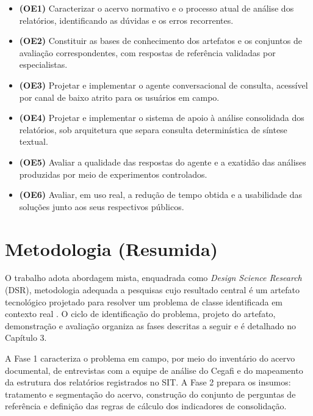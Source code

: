 \begin{itemize}
	\item \textbf{(OE1)} Caracterizar o acervo normativo e o processo atual de
	análise dos relatórios, identificando as dúvidas e os erros recorrentes.

	\item \textbf{(OE2)} Constituir as bases de conhecimento dos artefatos e os
	conjuntos de avaliação correspondentes, com respostas de referência validadas
	por especialistas.

	\item \textbf{(OE3)} Projetar e implementar o agente conversacional de
	consulta, acessível por canal de baixo atrito para os usuários em campo.

	\item \textbf{(OE4)} Projetar e implementar o sistema de apoio à análise
	consolidada dos relatórios, sob arquitetura que separa consulta determinística
	de síntese textual.

	\item \textbf{(OE5)} Avaliar a qualidade das respostas do agente e a exatidão
	das análises produzidas por meio de experimentos controlados.

	\item \textbf{(OE6)} Avaliar, em uso real, a redução de tempo obtida e a
	usabilidade das soluções junto aos seus respectivos públicos.
\end{itemize}

\section{Metodologia (Resumida)}
\label{sec:introducao-metodologia}

O trabalho adota abordagem mista, enquadrada como \textit{Design Science
Research} (DSR), metodologia adequada a pesquisas cujo resultado central é um
artefato tecnológico projetado para resolver um problema de classe identificada
em contexto real \cite{hevner2004,wieringa2014}. O ciclo de identificação do
problema, projeto do artefato, demonstração e avaliação organiza as fases
descritas a seguir e é detalhado no Capítulo 3.

A Fase 1 caracteriza o problema em campo, por meio do inventário do acervo
documental, de entrevistas com a equipe de análise do Cegafi e do mapeamento da
estrutura dos relatórios registrados no SIT. A Fase 2 prepara os insumos:
tratamento e segmentação do acervo, construção do conjunto de perguntas de
referência e definição das regras de cálculo dos indicadores de consolidação.

